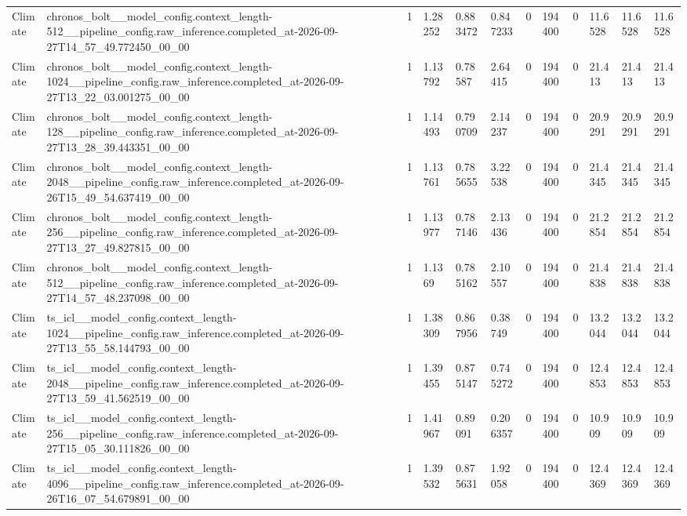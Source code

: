 \begin{tabular}{llllllllllll}
Climate & chronos\_bolt\_\_model\_config.context\_length-512\_\_pipeline\_config.raw\_inference.completed\_at-2026-09-27T14\_57\_49.772450\_00\_00 & 1 & 1.28252 & 0.883472 & 0.847233 & 0 & 194400 & 0 & 11.6528 & 11.6528 & 11.6528 \\
Climate & chronos\_bolt\_\_model\_config.context\_length-1024\_\_pipeline\_config.raw\_inference.completed\_at-2026-09-27T13\_22\_03.001275\_00\_00 & 1 & 1.13792 & 0.78587 & 2.64415 & 0 & 194400 & 0 & 21.413 & 21.413 & 21.413 \\
Climate & chronos\_bolt\_\_model\_config.context\_length-128\_\_pipeline\_config.raw\_inference.completed\_at-2026-09-27T13\_28\_39.443351\_00\_00 & 1 & 1.14493 & 0.790709 & 2.14237 & 0 & 194400 & 0 & 20.9291 & 20.9291 & 20.9291 \\
Climate & chronos\_bolt\_\_model\_config.context\_length-2048\_\_pipeline\_config.raw\_inference.completed\_at-2026-09-26T15\_49\_54.637419\_00\_00 & 1 & 1.13761 & 0.785655 & 3.22538 & 0 & 194400 & 0 & 21.4345 & 21.4345 & 21.4345 \\
Climate & chronos\_bolt\_\_model\_config.context\_length-256\_\_pipeline\_config.raw\_inference.completed\_at-2026-09-27T13\_27\_49.827815\_00\_00 & 1 & 1.13977 & 0.787146 & 2.13436 & 0 & 194400 & 0 & 21.2854 & 21.2854 & 21.2854 \\
Climate & chronos\_bolt\_\_model\_config.context\_length-512\_\_pipeline\_config.raw\_inference.completed\_at-2026-09-27T14\_57\_48.237098\_00\_00 & 1 & 1.1369 & 0.785162 & 2.10557 & 0 & 194400 & 0 & 21.4838 & 21.4838 & 21.4838 \\
Climate & ts\_icl\_\_model\_config.context\_length-1024\_\_pipeline\_config.raw\_inference.completed\_at-2026-09-27T13\_55\_58.144793\_00\_00 & 1 & 1.38309 & 0.867956 & 0.38749 & 0 & 194400 & 0 & 13.2044 & 13.2044 & 13.2044 \\
Climate & ts\_icl\_\_model\_config.context\_length-2048\_\_pipeline\_config.raw\_inference.completed\_at-2026-09-27T13\_59\_41.562519\_00\_00 & 1 & 1.39455 & 0.875147 & 0.745272 & 0 & 194400 & 0 & 12.4853 & 12.4853 & 12.4853 \\
Climate & ts\_icl\_\_model\_config.context\_length-256\_\_pipeline\_config.raw\_inference.completed\_at-2026-09-27T15\_05\_30.111826\_00\_00 & 1 & 1.41967 & 0.89091 & 0.206357 & 0 & 194400 & 0 & 10.909 & 10.909 & 10.909 \\
Climate & ts\_icl\_\_model\_config.context\_length-4096\_\_pipeline\_config.raw\_inference.completed\_at-2026-09-26T16\_07\_54.679891\_00\_00 & 1 & 1.39532 & 0.875631 & 1.92058 & 0 & 194400 & 0 & 12.4369 & 12.4369 & 12.4369 \\

\end{tabular}
